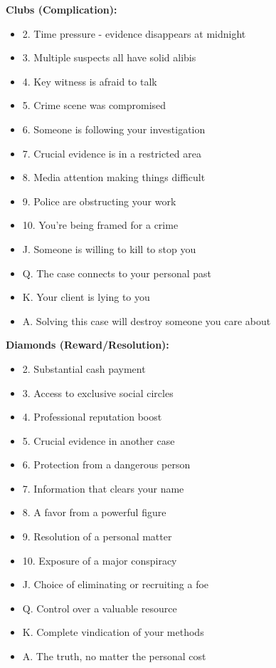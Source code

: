 \documentclass[11pt]{article}
\begin{document}
\textbf{Clubs (Complication):}
\begin{itemize}
    \item 2. Time pressure - evidence disappears at midnight
    \item 3. Multiple suspects all have solid alibis
    \item 4. Key witness is afraid to talk
    \item 5. Crime scene was compromised
    \item 6. Someone is following your investigation
    \item 7. Crucial evidence is in a restricted area
    \item 8. Media attention making things difficult
    \item 9. Police are obstructing your work
    \item 10. You're being framed for a crime
    \item J. Someone is willing to kill to stop you
    \item Q. The case connects to your personal past
    \item K. Your client is lying to you
    \item A. Solving this case will destroy someone you care about
\end{itemize}

\textbf{Diamonds (Reward/Resolution):}
\begin{itemize}
    \item 2. Substantial cash payment
    \item 3. Access to exclusive social circles
    \item 4. Professional reputation boost
    \item 5. Crucial evidence in another case
    \item 6. Protection from a dangerous person
    \item 7. Information that clears your name
    \item 8. A favor from a powerful figure
    \item 9. Resolution of a personal matter
    \item 10. Exposure of a major conspiracy
    \item J. Choice of eliminating or recruiting a foe
    \item Q. Control over a valuable resource
    \item K. Complete vindication of your methods
    \item A. The truth, no matter the personal cost
\end{itemize}
\end{document}
